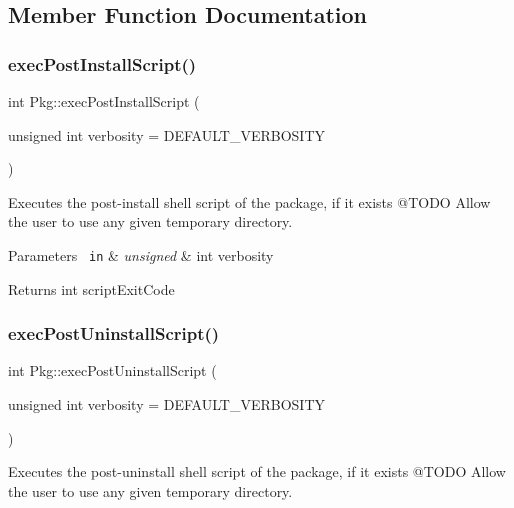 \subsection{Member Function Documentation}
\mbox{\label{classPkg_a62fed0e8f8d13a30c7735e16aeebe046}} 
\subsubsection{\texorpdfstring{execPostInstallScript()}{execPostInstallScript()}}
{\footnotesize\ttfamily int Pkg\+::exec\+Post\+Install\+Script (\begin{DoxyParamCaption}\item[{unsigned int}]{verbosity = {\ttfamily DEFAULT\+\_\+VERBOSITY} }\end{DoxyParamCaption})}



Executes the post-\/install shell script of the package, if it exists @\+T\+O\+DO Allow the user to use any given temporary directory. 


\begin{DoxyParams}[1]{Parameters}
\mbox{\texttt{ in}}  & {\em unsigned} & int verbosity\\
\hline
\end{DoxyParams}
\begin{DoxyReturn}{Returns}
int script\+Exit\+Code 
\end{DoxyReturn}
\mbox{\label{classPkg_aba52920e6c2b65bb71b6904d74dd6754}} 
\subsubsection{\texorpdfstring{execPostUninstallScript()}{execPostUninstallScript()}}
{\footnotesize\ttfamily int Pkg\+::exec\+Post\+Uninstall\+Script (\begin{DoxyParamCaption}\item[{unsigned int}]{verbosity = {\ttfamily DEFAULT\+\_\+VERBOSITY} }\end{DoxyParamCaption})}



Executes the post-\/uninstall shell script of the package, if it exists @\+T\+O\+DO Allow the user to use any given temporary directory. 


